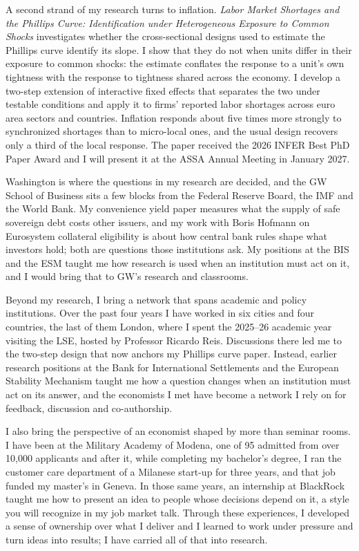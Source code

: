 \documentclass[11pt]{article}
\begin{document}
A second strand of my research turns to inflation. \textit{Labor Market Shortages and the Phillips Curve: Identification under Heterogeneous Exposure to Common Shocks} investigates whether the cross-sectional designs used to estimate the Phillips curve identify its slope. I show that they do not when units differ in their exposure to common shocks: the estimate conflates the response to a unit's own tightness with the response to tightness shared across the economy. I develop a two-step extension of interactive fixed effects that separates the two under testable conditions and apply it to firms' reported labor shortages across euro area sectors and countries. Inflation responds about five times more strongly to synchronized shortages than to micro-local ones, and the usual design recovers only a third of the local response. The paper received the 2026 INFER Best PhD Paper Award and I will present it at the ASSA Annual Meeting in January 2027.

Washington is where the questions in my research are decided, and the GW School of Business sits a few blocks from the Federal Reserve Board, the IMF and the World Bank. My convenience yield paper measures what the supply of safe sovereign debt costs other issuers, and my work with Boris Hofmann on Eurosystem collateral eligibility is about how central bank rules shape what investors hold; both are questions those institutions ask. My positions at the BIS and the ESM taught me how research is used when an institution must act on it, and I would bring that to GW's research and classrooms.

Beyond my research, I bring a network that spans academic and policy institutions. Over the past four years I have worked in six cities and four countries, the last of them London, where I spent the 2025--26 academic year visiting the LSE, hosted by Professor Ricardo Reis. Discussions there led me to the two-step design that now anchors my Phillips curve paper. Instead, earlier research positions at the Bank for International Settlements and the European Stability Mechanism taught me how a question changes when an institution must act on its answer, and the economists I met have become a network I rely on for feedback, discussion and co-authorship.

I also bring the perspective of an economist shaped by more than seminar rooms. I have been at the Military Academy of Modena, one of 95 admitted from over 10,000 applicants and after it, while completing my bachelor's degree, I ran the customer care department of a Milanese start-up for three years, and that job funded my master's in Geneva. In those same years, an internship at BlackRock taught me how to present an idea to people whose decisions depend on it, a style you will recognize in my job market talk. Through these experiences, I developed a sense of ownership over what I deliver and I learned to work under pressure and turn ideas into results; I have carried all of that into research. %
\end{document}

